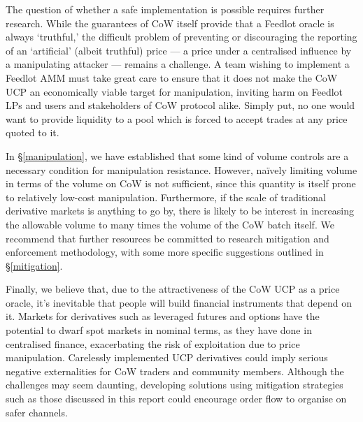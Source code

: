 \documentclass[a4paper,10pt]{article}
\theoremstyle{remark}
\begin{document}
The question of whether a safe implementation is possible requires further research.
%
While the guarantees of CoW itself provide that a Feedlot oracle is always `truthful,' the difficult problem of preventing or discouraging the reporting of an `artificial' (albeit truthful) price --- a price under a centralised influence by a manipulating attacker --- remains a challenge. 
%
A team wishing to implement a Feedlot AMM must take great care to ensure that it does not make the CoW UCP an economically viable target for manipulation, inviting harm on Feedlot LPs and users and stakeholders of CoW protocol alike.
%
Simply put, no one would want to provide liquidity to a pool which is forced to accept trades at any price quoted to it.

In \S\ref{manipulation}, we have established that some kind of volume controls are a necessary condition for manipulation resistance.
%
However, na\"ively limiting volume in terms of the volume on CoW is not sufficient, since this quantity is itself prone to relatively low-cost manipulation.
%
Furthermore, if the scale of traditional derivative markets is anything to go by, there is likely to be interest in increasing the allowable volume to many times the volume of the CoW batch itself.
%
We recommend that further resources be committed to research mitigation and enforcement methodology, with some more specific suggestions outlined in \S\ref{mitigation}.

Finally, we believe that, due to the attractiveness of the CoW UCP as a price oracle, it's inevitable that people will build financial instruments that depend on it.
%
Markets for derivatives such as leveraged futures and options have the potential to dwarf spot markets in nominal terms, as they have done in centralised finance, exacerbating the risk of exploitation due to price manipulation.
%
Carelessly implemented UCP derivatives could imply serious negative externalities for CoW traders and community members.
%
Although the challenges may seem daunting, developing solutions using mitigation strategies such as those discussed in this report could encourage order flow to organise on safer channels.

\printbibliography
\end{document}
